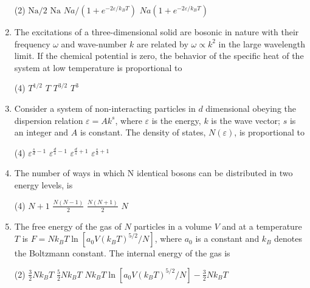 \begin{enumerate}
	\begin{tasks}(2)
		\task[\textbf{A.}] $\mathrm{Na} / 2$
		\task[\textbf{B.}] $\mathrm{Na}$
		\task[\textbf{C.}] $N a /\left(1+e^{-2 \varepsilon / k_{B} T}\right)$
		\task[\textbf{D.}] $N a\left(1+e^{-2 \varepsilon / k_{B} T}\right)$
	\end{tasks}
	\item The excitations of a three-dimensional solid are bosonic in nature with their frequency $\omega$ and wave-number $k$ are related by $\omega \propto k^{2}$ in the large wavelength limit. If the chemical potential is zero, the behavior of the specific heat of the system at low temperature is proportional to
	{}
	\begin{tasks}(4)
		\task[\textbf{A.}] $T^{1 / 2}$
		\task[\textbf{B.}] $T$
		\task[\textbf{C.}]  $T^{3 / 2}$
		\task[\textbf{D.}] $T^{3}$
	\end{tasks}
	\item Consider a system of non-interacting particles in $d$ dimensional obeying the dispersion relation $\varepsilon=A k^{s}$, where $\varepsilon$ is the energy, $k$ is the wave vector; $s$ is an integer and $A$ is constant. The density of states, $N(\varepsilon)$, is proportional to
	{}
	\begin{tasks}(4)
		\task[\textbf{A.}] $\varepsilon^{\frac{s}{d}-1}$
		\task[\textbf{B.}] $\varepsilon^{\frac{d}{s}-1}$
		\task[\textbf{C.}] $\varepsilon^{\frac{d}{s}+1}$
		\task[\textbf{D.}] $\varepsilon^{\frac{s}{d}+1}$
	\end{tasks}
	\item The number of ways in which $\mathrm{N}$ identical bosons can be distributed in two energy levels, is
	{}
	\begin{tasks}(4)
		\task[\textbf{A.}] $N+1$
		\task[\textbf{B.}] $\frac{N(N-1)}{2}$
		\task[\textbf{C.}] $\frac{N(N+1)}{2}$
		\task[\textbf{D.}] $N$
	\end{tasks}
	\item The free energy of the gas of $N$ particles in a volume $V$ and at a temperature $T$ is $F=N k_{B} T \ln \left[a_{0} V\left(k_{B} T\right)^{5 / 2} / N\right]$, where $a_{0}$ is a constant and $k_{B}$ denotes the Boltzmann constant. The internal energy of the gas is
	{}
	\begin{tasks}(2)
		\task[\textbf{A.}] $\frac{3}{2} N k_{B} T$
		\task[\textbf{B.}] $\frac{5}{2} N k_{B} T$
		\task[\textbf{C.}] $N k_{B} T \ln \left[a_{0} V\left(k_{B} T\right)^{5 / 2} / N\right]-\frac{3}{2} N k_{B} T$

\end{tasks}
\end{enumerate}
